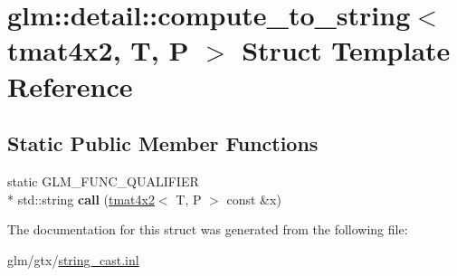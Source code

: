 \hypertarget{structglm_1_1detail_1_1compute__to__string_3_01tmat4x2_00_01T_00_01P_01_4}{\section{glm\-:\-:detail\-:\-:compute\-\_\-to\-\_\-string$<$ tmat4x2, T, P $>$ Struct Template Reference}
\label{structglm_1_1detail_1_1compute__to__string_3_01tmat4x2_00_01T_00_01P_01_4}
}
\subsection*{Static Public Member Functions}
\begin{DoxyCompactItemize}
\item 
\hypertarget{structglm_1_1detail_1_1compute__to__string_3_01tmat4x2_00_01T_00_01P_01_4_a1371cdf230f35b3c1fbd8cfad23bd364}{static G\-L\-M\-\_\-\-F\-U\-N\-C\-\_\-\-Q\-U\-A\-L\-I\-F\-I\-E\-R \\*
std\-::string {\bfseries call} (\hyperlink{structglm_1_1tmat4x2}{tmat4x2}$<$ T, P $>$ const \&x)}\label{structglm_1_1detail_1_1compute__to__string_3_01tmat4x2_00_01T_00_01P_01_4_a1371cdf230f35b3c1fbd8cfad23bd364}

\end{DoxyCompactItemize}


The documentation for this struct was generated from the following file\-:\begin{DoxyCompactItemize}
\item 
glm/gtx/\hyperlink{string__cast_8inl}{string\-\_\-cast.\-inl}\end{DoxyCompactItemize}
